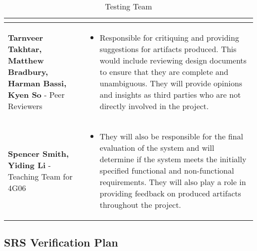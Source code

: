 \documentclass[12pt, titlepage]{article}
\begin{document}
\begin{table}
\begin{tabular}{ | m{5cm} | m{9cm} | }
\begin{itemize}
    \end{itemize}\\
    \hline
    \textbf{Tarnveer Takhtar, Matthew Bradbury, Harman Bassi, Kyen So}
    - Peer Reviewers &
    \begin{itemize}
      \item Responsible for critiquing and providing suggestions for artifacts
        produced. This would include reviewing design documents to ensure that
        they are complete and unambiguous. They will provide opinions and
        insights as third parties who are not directly involved in the project.
    \end{itemize}\\
    \hline
    \textbf{Spencer Smith, Yiding Li} - Teaching Team for 4G06 &
    \begin{itemize}
      \item They will also be responsible for the final
        evaluation of the system and will determine if the system meets the
        initially specified functional and non-functional requirements.
        They will also play a role in providing feedback on produced artifacts
        throughout the project.
    \end{itemize}\\
    \hline

  \end{tabular}
  \caption{Testing Team}
\end{table}
\newpage
\subsection{SRS Verification Plan}
\end{document}
